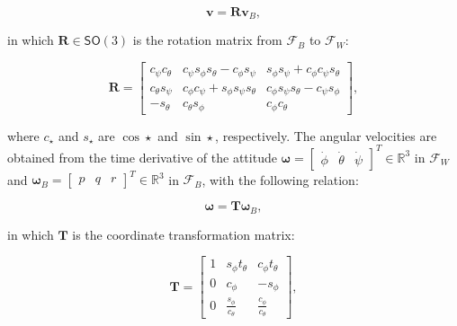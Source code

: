 \begin{equation}
  \mathbf{v} = \mathbf{R} \mathbf{v}_B,
  \label{eq:linear_velocity}
\end{equation}

in which $\mathbf{R} \in \mathsf{SO}(3)$ is the rotation matrix from
$\mathcal{F}_B$ to $\mathcal{F}_W$:

\begin{equation}
  \mathbf{R} = \begin{bmatrix}c_{\psi} c_{\theta} & c_{\psi} s_{\phi}
  s_{\theta} - c_{\phi} s_{\psi} & s_{\phi} s_{\psi} + c_{\phi} c_{\psi}
  s_{\theta} \\ c_{\theta} s_{\psi} & c_{\phi} c_{\psi} + s_{\phi} s_{\psi}
  s_{\theta} & c_{\phi} s_{\psi} s_{\theta} - c_{\psi} s_{\phi} \\ -s_{\theta} &
  c_{\theta} s_{\phi} & c_{\phi} c_{\theta}\end{bmatrix},
  \label{eq:rotation_matrix}
\end{equation}

where $c_{\star}$ and $s_{\star}$ are $\cos\star$ and $\sin\star$,
respectively. The angular velocities are obtained from the time derivative
of the attitude $\boldsymbol{\omega} = \begin{bmatrix}\dot{\phi} &
\dot{\theta} & \dot{\psi}\end{bmatrix}^T \in \mathbb{R}^3$ in
$\mathcal{F}_W$ and $\boldsymbol{\omega}_B = \begin{bmatrix} p & q & r
\end{bmatrix}^{T} \in \mathbb{R}^3$ in $\mathcal{F}_B$, with the
following relation:

\begin{equation}
  \boldsymbol{\omega} = \mathbf{T} \boldsymbol{\omega}_B,
  \label{eq:angular_velocity_transformation}
\end{equation}

in which $\mathbf{T}$ is the coordinate transformation matrix:

\begin{equation}
  \mathbf{T} = \begin{bmatrix} 1 & s_{\phi} t_{\theta} & c_{\phi} t_{\theta} \\ 0
  & c_{\phi} & -s_{\phi} \\ 0 & \frac{s_{\phi}}{c_{\theta}} &
  \frac{c_{\phi}}{c_{\theta}} \end{bmatrix},
\end{equation}

